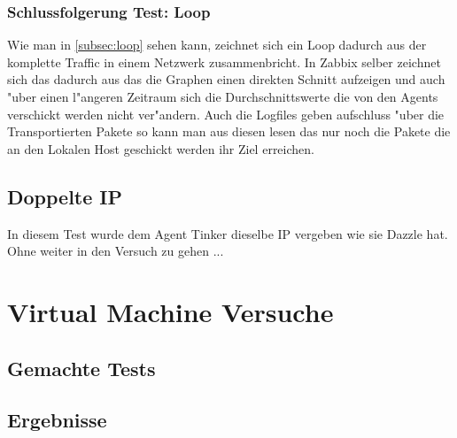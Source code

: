 \subsubsection{Schlussfolgerung Test: Loop}
\label{subsubsec:schlussfolgerung:loop}

Wie man in \cref{subsec:loop} sehen kann, zeichnet sich ein Loop dadurch aus der komplette Traffic in einem Netzwerk zusammenbricht. In Zabbix selber zeichnet sich das %
dadurch aus das die Graphen einen direkten Schnitt aufzeigen und auch "uber einen l"angeren Zeitraum sich die Durchschnittswerte die von den Agents verschickt werden nicht %
ver"andern. Auch die Logfiles geben aufschluss "uber die Transportierten Pakete so kann man aus diesen lesen das nur noch die Pakete die an den Lokalen Host geschickt werden %
ihr Ziel erreichen.  


\subsection{Doppelte IP}
In diesem Test wurde dem Agent Tinker dieselbe IP vergeben wie sie Dazzle hat. Ohne weiter in den Versuch zu gehen ...

\section{Virtual Machine Versuche}
\label{sec:VMVersuche}
\subsection{Gemachte Tests}
\subsection{Ergebnisse}



